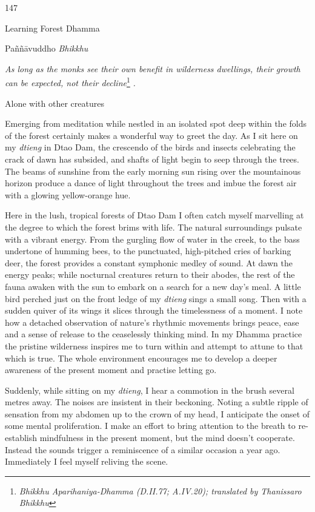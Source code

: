 147

Learning Forest Dhamma

Paññāvuddho \emph{Bhikkhu}

\emph{As long as the monks see their own benefit in wilderness
dwellings, their growth can be expected, not their decline}\footnote{\emph{Bhikkhu
  Aparihaniya-Dhamma (D.II.77; A.IV.20); translated by Thanissaro
  Bhikkhu}} \emph{.}

Alone with other creatures

Emerging from meditation while nestled in an isolated spot deep within
the folds of the forest certainly makes a wonderful way to greet the
day. As I sit here on my \emph{dtieng} in Dtao Dam, the crescendo of the
birds and insects celebrating the crack of dawn has subsided, and shafts
of light begin to seep through the trees. The beams of sunshine from the
early morning sun rising over the mountainous horizon produce a dance of
light throughout the trees and imbue the forest air with a glowing
yellow-orange hue.

Here in the lush, tropical forests of Dtao Dam I often catch myself
marvelling at the degree to which the forest brims with life. The
natural surroundings pulsate with a vibrant energy. From the gurgling
flow of water in the creek, to the bass undertone of humming bees, to
the punctuated, high-pitched cries of barking deer, the forest provides
a constant symphonic medley of sound. At dawn the energy peaks; while
nocturnal creatures return to their abodes, the rest of the fauna awaken
with the sun to embark on a search for a new day's meal. A little bird
perched just on the front ledge of my \emph{dtieng} sings a small song.
Then with a sudden quiver of its wings it slices through the
timelessness of a moment. I note how a detached observation of nature's
rhythmic movements brings peace, ease and a sense of release to the
ceaselessly thinking mind. In my Dhamma practice the pristine wilderness
inspires me to turn within and attempt to attune to that which is true.
The whole environment encourages me to develop a deeper awareness of the
present moment and practise letting go.

Suddenly, while sitting on my \emph{dtieng}, I hear a commotion in the
brush several metres away. The noises are insistent in their beckoning.
Noting a subtle ripple of sensation from my abdomen up to the crown of
my head, I anticipate the onset of some mental proliferation. I make an
effort to bring attention to the breath to re-establish mindfulness in
the present moment, but the mind doesn't cooperate. Instead the sounds
trigger a reminiscence of a similar occasion a year ago. Immediately I
feel myself reliving the scene.

